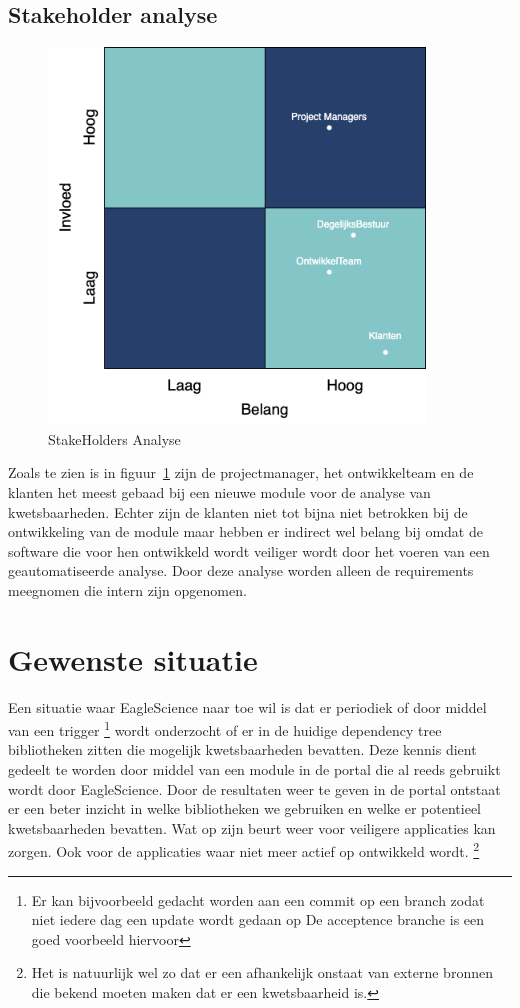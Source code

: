 \subsection{Stakeholder analyse}\label{subsec:stakeholder-analyse}
\begin{figure}[H]
    \myfloatalign
    \includegraphics[width=10cm]{gfx/stakeholderanalyse}
    \caption{StakeHolders Analyse}
    \label{fig:StakeholderAnalyse}
\end{figure}
Zoals te zien is in figuur~\ref{fig:StakeholderAnalyse} zijn de projectmanager, het ontwikkelteam en de klanten het meest gebaad bij een nieuwe module voor de analyse van kwetsbaarheden.
Echter zijn de klanten niet tot bijna niet betrokken bij de ontwikkeling van de module maar hebben er indirect wel belang bij omdat de software die voor hen ontwikkeld wordt veiliger wordt door het voeren van een geautomatiseerde analyse.
Door deze analyse worden alleen de requirements meegnomen die intern zijn opgenomen.


\section{Gewenste situatie}\label{sec:gewenste-situatie}
Een situatie waar EagleScience naar toe wil is dat er periodiek of door middel van een trigger \footnote{Er kan bijvoorbeeld gedacht worden aan een commit op een branch zodat niet iedere dag een update wordt gedaan op De acceptence branche is een goed voorbeeld hiervoor} wordt onderzocht of er in de huidige dependency tree bibliotheken zitten die mogelijk kwetsbaarheden bevatten. Deze kennis dient gedeelt te worden door middel van een module in de portal die al reeds gebruikt wordt door EagleScience. Door de resultaten weer te geven in de portal ontstaat er een beter inzicht in welke bibliotheken we gebruiken en welke er potentieel kwetsbaarheden bevatten. Wat op zijn beurt weer voor veiligere applicaties kan zorgen. Ook voor de applicaties waar niet meer actief op ontwikkeld wordt. \footnote{Het is natuurlijk wel zo dat er een afhankelijk onstaat van externe bronnen die bekend moeten maken dat er een kwetsbaarheid is.}



